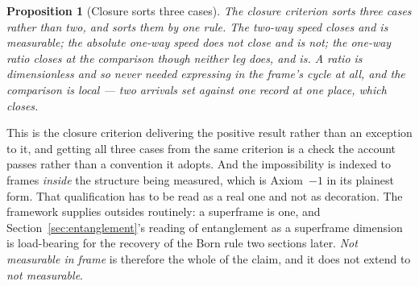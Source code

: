 \documentclass[11pt,a4paper]{article}
\newtheorem{proposition}[definition]{Proposition}
\theoremstyle{remark}\newtheorem{remark}[definition]{Remark}
\begin{document}
\begin{proposition}[Closure sorts three cases]\label{prop:closure-three}
The closure criterion sorts three cases rather than two, and sorts them by one rule. The two-way
speed closes and is measurable; the absolute one-way speed does not close and is not; the one-way
ratio closes at the comparison though neither leg does, and is. A ratio is dimensionless and so never
needed expressing in the frame's cycle at all, and the comparison is local --- two arrivals set
against one record at one place, which closes.
\end{proposition}

This is the closure criterion delivering the positive result rather than an exception to it, and
getting all three cases from the same criterion is a check the account passes rather than a
convention it adopts. And the impossibility is indexed to frames \emph{inside} the structure being
measured, which is Axiom~$-1$ in its plainest form. That qualification has to be read as a real one
and not as decoration. The framework supplies outsides routinely: a superframe is one, and
Section~\ref{sec:entanglement}'s reading of entanglement as a superframe dimension is load-bearing
for the recovery of the Born rule two sections later. \emph{Not measurable in frame} is therefore the
whole of the claim, and it does not extend to \emph{not measurable}.
\end{document}
